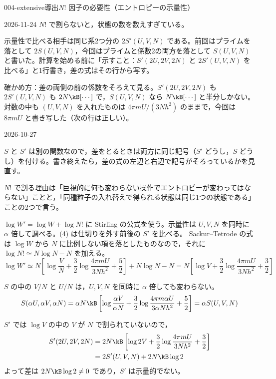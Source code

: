 \documentclass[uplatex,dvipdfmx,a4paper,11pt]{jsarticle}
\begin{document}
\begin{mondai}{004-extensive}{導出}{$N!$ 因子の必要性（エントロピーの示量性）}
\begin{kotaeutsushi}{2026-11-24}
$N!$ で割らないと，状態の数を数えすぎている。
\end{kotaeutsushi}
\begin{kizuki}
\item {} 示量性で比べる相手は同じ系2つ分の $2S'(U,V,N)$ である。前回はプライムを落として $2S(U,V,N)$，今回はプライムと係数2の両方を落として $S(U,V,N)$ と書いた。計算を始める前に「示すこと：$S'(2U,2V,2N)$ と $2S'(U,V,N)$ を比べる」と1行書き，差の式はその行から写す。
\item 確かめ方：差の両側の前の係数をそろえて見る。$S'(2U,2V,2N)$ も $2S'(U,V,N)$ も $2N\kB[\cdots]$ で，$S(U,V,N)$ なら $N\kB[\cdots]$ と半分しかない。対数の中も $(U,V,N)$ を入れたものは $4\pi mU/(3Nh^{2})$ のままで，今回は $8\pi mU$ と書き写した（次の行は正しい）。
\end{kizuki}
\begin{maekizuki}{2026-10-27}
\item $S$ と $S'$ は別の関数なので，差をとるときは両方に同じ記号（$S'$ どうし，$S$ どうし）を付ける。書き終えたら，差の式の左辺と右辺で記号がそろっているかを見直す。
\item $N!$ で割る理由は「巨視的に何も変わらない操作でエントロピーが変わってはならない」ことと，「同種粒子の入れ替えで得られる状態は同じ1つの状態である」ことの2つで言う。
\end{maekizuki}
\begin{tadashii}
\houshin $\log W'=\log W+\log N!$ に Stirling の公式を使う。示量性は $U,V,N$ を同時に $\alpha$ 倍して調べる。(4) は仕切りを外す前後の $S'$ を比べる。
\keisan
{} Sackur--Tetrode の式は $\log W$ から $N$ に比例しない項を落としたものなので，それに $\log N!\simeq N\log N-N$ を加える。
\[\log W'\simeq N\left[\log\frac{V}{N}+\frac{3}{2}\log\frac{4\pi mU}{3Nh^{2}}+\frac{5}{2}\right]+N\log N-N=N\left[\log V+\frac{3}{2}\log\frac{4\pi mU}{3Nh^{2}}+\frac{3}{2}\right]\]

 $S$ の中の $V/N$ と $U/N$ は，$U,V,N$ を同時に $\alpha$ 倍しても変わらない。
\[S(\alpha U,\alpha V,\alpha N)=\alpha N\kB\left[\log\frac{\alpha V}{\alpha N}+\frac{3}{2}\log\frac{4\pi m\alpha U}{3\alpha Nh^{2}}+\frac{5}{2}\right]=\alpha S(U,V,N)\]

 $S'$ では $\log V$ の中の $V$ が $N$ で割られていないので，
\begin{align*}
S'(2U,2V,2N)&=2N\kB\left[\log2V+\frac{3}{2}\log\frac{4\pi mU}{3Nh^{2}}+\frac{3}{2}\right]\\
&=2S'(U,V,N)+2N\kB\log2
\end{align*}
よって差は $2N\kB\log2\neq0$ であり，$S'$ は示量的でない。


\end{tadashii}
\end{mondai}
\end{document}
